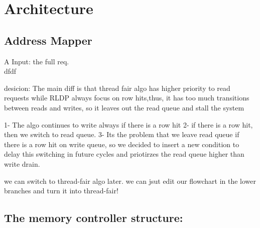 \chapter{Architecture}


\section{Address Mapper}
\hspace{10mm}A Input:  the full req.\\ dfdf




desicion:
The main diff is that thread fair algo has higher priority to read requests while RLDP always 
focus on row hits,thus, it has too much transitions between reads and writes, so it leaves out 
the read queue and stall the system 


1- The algo continues to write always if there is a row hit
2- if there is a row hit, then we switch to read queue.
3- Its the problem that we leave read queue if there is a row hit on write queue, so we
decided to insert a new condition to delay this switching in future cycles and priotirzes the read queue higher than write drain.


we can switch to thread-fair algo later. we can jsut edit our flowchart in the lower branches 
and turn it into thread-fair!






\section{The memory controller structure:}
        

